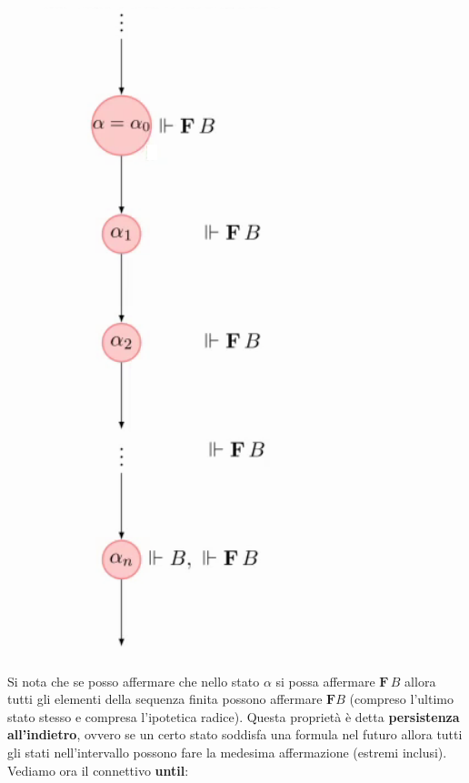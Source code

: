 \documentclass[a4paper,12pt, oneside]{book}
\begin{document}
\begin{esempio}
\begin{figure}[H]
    \includegraphics[scale = 0.27]{img/pltl3.png}
  \end{figure}
  Si nota che se posso affermare che nello stato $\alpha$ si possa affermare
  $\mathbf{F}\,B$ allora tutti gli elementi della sequenza finita possono
  affermare $\mathbf{F}B$ (compreso l'ultimo stato stesso e compresa l'ipotetica
  radice).
  \newpage
  Questa proprietà è detta \textbf{persistenza all'indietro}, ovvero se
  un certo stato soddisfa una formula nel futuro allora tutti gli stati
  nell'intervallo possono fare la medesima affermazione (estremi inclusi).\\
  Vediamo ora il connettivo \textbf{until}:
  \begin{figure}[H]
    \centering

\end{figure}
\end{esempio}
\end{document}
